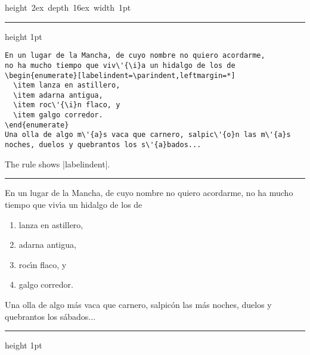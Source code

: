 \documentclass[a4paper]{ltxguide}
\begin{document}
\small

\newcommand{\newsample}{\vskip6pt\goodbreak\hrule height 1pt\vskip6pt}
\newcommand{\samplesep}{\vskip6pt\goodbreak\hrule\vskip6pt}
\newbox\vsep
\setbox\vsep\hbox{\vrule height 2ex depth 16ex width 1pt}
\dp{}
\newcommand\showsep{\leavevmode\llap{\copy\vsep}}

\newsample

\begin{verbatim}
En un lugar de la Mancha, de cuyo nombre no quiero acordarme,
no ha mucho tiempo que viv\'{\i}a un hidalgo de los de
\begin{enumerate}[labelindent=\parindent,leftmargin=*]
  \item lanza en astillero,
  \item adarna antigua,
  \item roc\'{\i}n flaco, y
  \item galgo corredor.
\end{enumerate}
Una olla de algo m\'{a}s vaca que carnero, salpic\'{o}n las m\'{a}s
noches, duelos y quebrantos los s\'{a}bados...
\end{verbatim}

The rule shows |labelindent|. 

\samplesep

\showsep En un lugar de la Mancha, de cuyo nombre no quiero acordarme,
no ha mucho tiempo que viv\'{\i}a un hidalgo de los de
\begin{enumerate}[labelindent=\parindent,leftmargin=*]
\item lanza en astillero,
\item adarna antigua,
\item roc\'{\i}n flaco, y
\item galgo corredor.
\end{enumerate}
Una olla de algo m\'{a}s vaca que carnero, salpic\'{o}n las m\'{a}s
noches, duelos y quebrantos los s\'{a}bados...

\newsample
\end{document}
